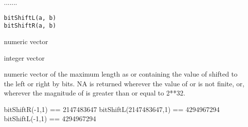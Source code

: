 \begin{Description}\relax
.......
\end{Description}
\begin{Usage}
\begin{verbatim}
bitShiftL(a, b)
bitShiftR(a, b)
\end{verbatim}
\end{Usage}
\begin{Arguments}
\begin{ldescription}
\item[\code{a}] numeric vector 
\item[\code{b}] integer vector 
\end{ldescription}
\end{Arguments}
\begin{Value}
numeric vector of the maximum length as  or  containing
the value of  shifted to the left or right by  bits.
NA is returned wherever the value of  or  is not finite,
or, wherever the magnitude of  is greater than or equal to 2**32.
\end{Value}
\begin{Examples}
\begin{ExampleCode}
  bitShiftR(-1,1) == 2147483647
  bitShiftL(2147483647,1) == 4294967294
  bitShiftL(-1,1) == 4294967294

\end{ExampleCode}
\end{Examples}

